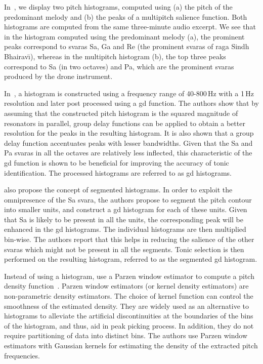 In~, we display two pitch histograms, computed using (a) the pitch of the predominant melody and (b) the peaks of a multipitch salience function. Both histograms are computed from the same three-minute audio excerpt. We see that in the histogram computed using the predominant melody (a), the prominent peaks correspond to \glspl{svara} Sa, Ga and Re (the prominent \glspl{svara} of \gls{raga} Sindh Bhairav\={\i}), whereas in the multipitch histogram (b), the top three peaks correspond to Sa (in two octaves) and Pa, which are the prominent \glspl{svara} produced by the drone instrument. 

In~\cite{bellur2012knowledge}, a histogram is constructed using a frequency range of 40-800\,Hz with a 1\,Hz resolution and later post processed using a \gls{gd} function. The authors show that by assuming that the constructed pitch histogram is the squared magnitude of resonators in parallel, group delay functions can be applied to obtain a better resolution for the peaks in the resulting histogram. It is also shown that a group delay function accentuates peaks with lesser bandwidths. Given that the Sa and Pa \glspl{svara} in all the octaves are relatively less inflected, this characteristic of the \gls{gd} function is shown to be beneficial for improving the accuracy of tonic identification. The processed histograms are referred to as \gls{gd} histograms.

\cite{bellur2012knowledge} also propose the concept of segmented histograms. In order to exploit the omnipresence of the Sa \gls{svara}, the authors propose to segment the pitch contour into smaller units, and construct a \gls{gd} histogram for each of these units. Given that Sa is likely to be present in all the units, the corresponding peak will be enhanced in the \gls{gd} histograms. The individual histograms are then multiplied bin-wise. The authors report that this helps in reducing the salience of the other \glspl{svara} which might not be present in all the segments. Tonic selection is then performed on the resulting histogram, referred to as the segmented \gls{gd} histogram.

Instead of using a histogram, \cite{ranjani2011carnatic} use a Parzen window estimator to compute a pitch density function~\citep{Bishop,DudaHart2000}. Parzen window estimators (or kernel density estimators) are non-parametric density estimators. The choice of kernel function can control the smoothness of the estimated density. They are widely used as an alternative to histograms to alleviate the artificial discontinuities at the boundaries of the bins of the histogram, and thus, aid in peak picking process. In addition, they do not require partitioning of data into distinct bins. The authors use Parzen window estimators with Gaussian kernels for estimating the density of the extracted pitch frequencies.


